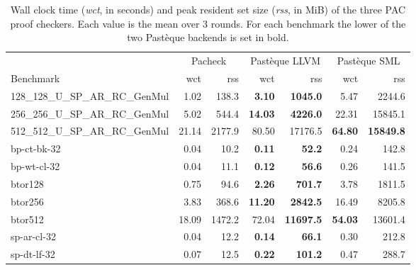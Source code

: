 \begin{table}[htbp]
  \centering
  \caption{Wall clock time (\emph{wct}, in seconds) and peak resident set size (\emph{rss}, in MiB) of the three PAC proof checkers. Each value is the mean over 3 rounds. For each benchmark the lower of the two Pastèque backends is set in bold.}
  \label{tab:checker-comparison}
  \begin{tabular}{l rr rr rr}
    \toprule
    & \multicolumn{2}{c}{Pacheck} & \multicolumn{2}{c}{Pastèque LLVM} & \multicolumn{2}{c}{Pastèque SML} \\
    \cmidrule(lr){2-3} \cmidrule(lr){4-5} \cmidrule(lr){6-7}
    Benchmark & wct & rss & wct & rss & wct & rss \\
    \midrule
    128\_128\_U\_SP\_AR\_RC\_GenMul & 1.02 & 138.3 & \textbf{3.10} & \textbf{1045.0} & 5.47 & 2244.6 \\
    256\_256\_U\_SP\_AR\_RC\_GenMul & 5.02 & 544.4 & \textbf{14.03} & \textbf{4226.0} & 22.31 & 15845.1 \\
    512\_512\_U\_SP\_AR\_RC\_GenMul & 21.14 & 2177.9 & 80.50 & 17176.5 & \textbf{64.80} & \textbf{15849.8} \\
    bp-ct-bk-32 & 0.04 & 10.2 & \textbf{0.11} & \textbf{52.2} & 0.24 & 142.8 \\
    bp-wt-cl-32 & 0.04 & 11.1 & \textbf{0.12} & \textbf{56.6} & 0.26 & 141.5 \\
    btor128 & 0.75 & 94.6 & \textbf{2.26} & \textbf{701.7} & 3.78 & 1811.5 \\
    btor256 & 3.83 & 368.6 & \textbf{11.20} & \textbf{2842.5} & 16.49 & 8205.8 \\
    btor512 & 18.09 & 1472.2 & 72.04 & \textbf{11697.5} & \textbf{54.03} & 13601.4 \\
    sp-ar-cl-32 & 0.04 & 12.2 & \textbf{0.14} & \textbf{66.1} & 0.30 & 212.8 \\
    sp-dt-lf-32 & 0.07 & 12.5 & \textbf{0.22} & \textbf{101.2} & 0.47 & 288.7 \\
    \bottomrule
  \end{tabular}
\end{table}
